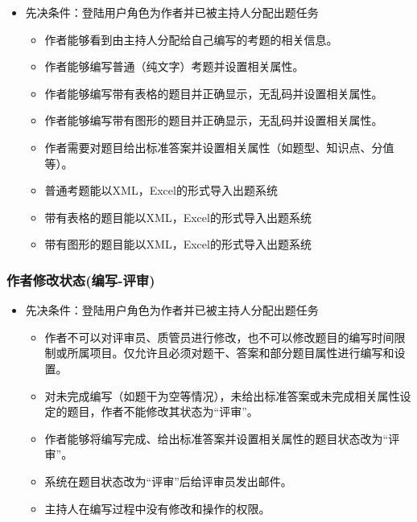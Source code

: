 \documentclass[hyperref, a4paper]{ctexart}
\providecommand{\tightlist}{%
  \setlength{\itemsep}{0pt}\setlength{\parskip}{0pt}}
\begin{document}
\begin{itemize}
\tightlist
\item
  先决条件：登陆用户角色为作者并已被主持人分配出题任务

  \begin{itemize}
  \tightlist
  \item
    作者能够看到由主持人分配给自己编写的考题的相关信息。
  \item
    作者能够编写普通（纯文字）考题并设置相关属性。
  \item
    作者能够编写带有表格的题目并正确显示，无乱码并设置相关属性。
  \item
    作者能够编写带有图形的题目并正确显示，无乱码并设置相关属性。
  \item
    作者需要对题目给出标准答案并设置相关属性（如题型、知识点、分值等）。
  \item
    普通考题能以XML，Excel的形式导入出题系统
  \item
    带有表格的题目能以XML，Excel的形式导入出题系统
  \item
    带有图形的题目能以XML，Excel的形式导入出题系统
  \end{itemize}
\end{itemize}

\hypertarget{ux4f5cux8005ux4feeux6539ux72b6ux6001ux7f16ux5199-ux8bc4ux5ba1}{%
\subsubsection{作者修改状态(编写-评审)}\label{ux4f5cux8005ux4feeux6539ux72b6ux6001ux7f16ux5199-ux8bc4ux5ba1}}

\begin{itemize}
\tightlist
\item
  先决条件：登陆用户角色为作者并已被主持人分配出题任务

  \begin{itemize}
  \tightlist
  \item
    作者不可以对评审员、质管员进行修改，也不可以修改题目的编写时间限制或所属项目。仅允许且必须对题干、答案和部分题目属性进行编写和设置。
  \item
    对未完成编写（如题干为空等情况），未给出标准答案或未完成相关属性设定的题目，作者不能修改其状态为``评审''。
  \item
    作者能够将编写完成、给出标准答案并设置相关属性的题目状态改为``评审''。
  \item
    系统在题目状态改为``评审''后给评审员发出邮件。
  \item
    主持人在编写过程中没有修改和操作的权限。
  \end{itemize}
\end{itemize}
\end{document}
